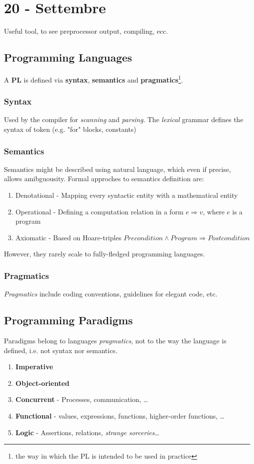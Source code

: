 \section*{20 - Settembre}
Useful tool, to see preprocessor output, compiling, ecc.
\subsection{Programming Languages}
A \textbf{PL} is defined via \textbf{syntax}, \textbf{semantics} and \textbf{pragmatics}\footnote{the way in which the PL is intended to be used in practice}.
\subsubsection{Syntax}
Used by the compiler for \textit{scanning} and \textit{parsing}.
The \textit{lexical} grammar defines the syntax of token (e.g. "for" blocks, constants)
\subsubsection{Semantics}
Semantics might be described using natural language, which even if precise, allows amibguousity.
Formal approches to semantics definition are:
\begin{enumerate}
    \item Denotational - Mapping every syntactic entity with a mathematical entity
    \item Operational - Defining a computation relation in a form $e \Rightarrow v$, where $e$ is a program
    \item Axiomatic - Based on Hoare-triples $\textit{Precondition} \wedge \textit{Program}\Rightarrow \textit{Postcondition}$ 
\end{enumerate}
However, they rarely scale to fully-fledged programming languages.
\subsubsection{Pragmatics}
\textit{Pragmatics} include coding conventions, guidelines for elegant code, etc.

\subsection{Programming Paradigms}
Paradigms belong to languages \textit{pragmatics}, not to the way the language is defined, i.e. not syntax nor semantics.
\begin{enumerate}
    \item \textbf{Imperative}
    \item \textbf{Object-oriented}
    \item \textbf{Concurrent} - Processes, communication, \dots 
    \item \textbf{Functional} - values, expressions,
    functions, higher-order functions, \dots
    \item \textbf{Logic} - Assertions, relations, \textit{strange sorceries}\dots 
\end{enumerate}

